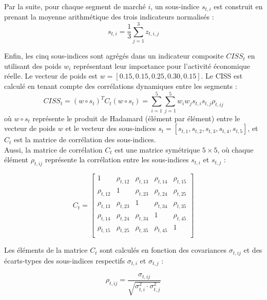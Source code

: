 Par la suite, pour chaque segment de marché \( i \), un sous-indice \( s_{t,i} \) est construit en prenant la moyenne arithmétique des trois indicateurs normalisés :
\begin{equation}
s_{t,i} = \frac{1}{3} \sum_{j=1}^{3} z_{t,i,j}
\end{equation}

Enfin, les cinq sous-indices sont agrégés dans un indicateur composite \( CISS_t \) en utilisant des poids \( w_i \) représentant leur importance pour l'activité économique réelle. Le vecteur de poids est \( w = [0.15, 0.15, 0.25, 0.30, 0.15] \). Le CISS est calculé en tenant compte des corrélations dynamiques entre les segments :
\begin{equation}
CISS_t = \left( w \circ s_t \right)^T C_t \left( w \circ s_t \right) = \sum_{i=1}^{5} \sum_{j=1}^{5} w_i w_j s_{t,i} s_{t,j} \rho_{t,ij}
\end{equation}
où \( w \circ s_t \) représente le produit de Hadamard (élément par élément) entre le vecteur de poids \( w \) et le vecteur des sous-indices \( s_t = [s_{t,1}, s_{t,2}, s_{t,3}, s_{t,4}, s_{t,5}] \), et \( C_t \) est la matrice de corrélation des sous-indices.\\

Aussi, la matrice de corrélation \( C_t \) est une matrice symétrique \( 5 \times 5 \), où chaque élément \( \rho_{t,ij} \) représente la corrélation entre les sous-indices \( s_{t,i} \) et \( s_{t,j} \) :

\begin{equation}
C_t = \begin{bmatrix}
1 & \rho_{t,12} & \rho_{t,13} & \rho_{t,14} & \rho_{t,15} \\
\rho_{t,12} & 1 & \rho_{t,23} & \rho_{t,24} & \rho_{t,25} \\
\rho_{t,13} & \rho_{t,23} & 1 & \rho_{t,34} & \rho_{t,35} \\
\rho_{t,14} & \rho_{t,24} & \rho_{t,34} & 1 & \rho_{t,45} \\
\rho_{t,15} & \rho_{t,25} & \rho_{t,35} & \rho_{t,45} & 1 \\
\end{bmatrix}
\end{equation}

Les éléments de la matrice \( C_t \) sont calculés en fonction des covariances \( \sigma_{t,ij} \) et des écarts-types des sous-indices respectifs \( \sigma_{t,i} \) et \( \sigma_{t,j} \) :

\begin{equation}
\rho_{t,ij} = \frac{\sigma_{t,ij}}{\sqrt{\sigma_{t,i}^2 \cdot \sigma_{t,j}^2}}
\end{equation}

